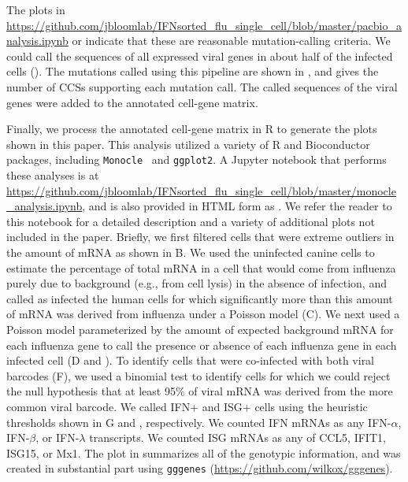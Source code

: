 \documentclass[9pt,lineno]{template}
\begin{document}
The plots in \url{https://github.com/jbloomlab/IFNsorted_flu_single_cell/blob/master/pacbio_analysis.ipynb} or  indicate that these are reasonable mutation-calling criteria.
We could call the sequences of all expressed viral genes in about half of the infected cells ().
The mutations called using this pipeline are shown in , and  gives the number of CCSs supporting each mutation call.
The called sequences of the viral genes were added to the annotated cell-gene matrix.

Finally, we process the annotated cell-gene matrix in R to generate the plots shown in this paper.
This analysis utilized a variety of R and Bioconductor~\citep{huber2015orchestrating} packages, including \texttt{Monocle}~\citep{qiu2017reversed, trapnell2014dynamics} and \texttt{ggplot2}.
A Jupyter notebook that performs these analyses is at \url{https://github.com/jbloomlab/IFNsorted_flu_single_cell/blob/master/monocle_analysis.ipynb}, and is also provided in HTML form as .
We refer the reader to this notebook for a detailed description and a variety of additional plots not included in the paper.
Briefly, we first filtered cells that were extreme outliers in the amount of mRNA as shown in B.
We used the uninfected canine cells to estimate the percentage of total mRNA in a cell that would come from influenza purely due to background (e.g., from cell lysis) in the absence of infection, and called as infected the human cells for which significantly more than this amount of mRNA was derived from influenza under a Poisson model (C).
We next used a Poisson model parameterized by the amount of expected background mRNA for each influenza gene to call the presence or absence of each influenza gene in each infected cell (D and ). 
To identify cells that were co-infected with both viral barcodes (F), we used a binomial test to identify cells for which we could reject the null hypothesis that at least 95\% of viral mRNA was derived from the more common viral barcode.
We called IFN+ and ISG+ cells using the heuristic thresholds shown in G and , respectively.
We counted IFN mRNAs as any IFN-$\alpha$, IFN-$\beta$, or IFN-$\lambda$ transcripts.
We counted ISG mRNAs as any of CCL5, IFIT1, ISG15, or Mx1.
The plot in  summarizes all of the genotypic information, and was created in substantial part using \texttt{gggenes} (\url{https://github.com/wilkox/gggenes}).
\end{document}
